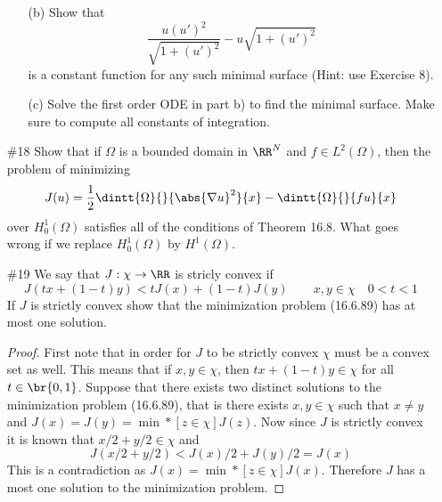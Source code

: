 \documentclass[11pt, oneside]{article}
\begin{document}
\begin{enumerate}
\begin{enumerate}
      \item[(b)]
        Show that
        \[
          \frac{u(u')^2}{\sqrt{1 + (u')^2}} - u\sqrt{1 + (u')^2}
        \]
        is a constant function for any such minimal surface (Hint: use Exercise 8).

      \item[(c)]
        Solve the first order ODE in part b) to find the minimal surface.
        Make sure to compute all constants of integration.
    \end{enumerate}

  \pagebreak
  \item[\#18]
    Show that if $\Omega$ is a bounded domain in $\RR^N$ and $f \in L^2(\Omega)$,
    then the problem of minimizing
    \[
      J(u) = \frac{1}{2} \dintt{\Omega}{}{\abs{\nabla u}^2}{x} - \dintt{\Omega}{}{f u}{x}
    \]
    over $H^1_0(\Omega)$ satisfies all of the conditions of Theorem 16.8.
    What goes wrong if we replace $H^1_0(\Omega)$ by $H^1(\Omega)$.

  \pagebreak
  \item[\#19] %
    We say that $J: \chi \to \RR$ is stricly convex if
    \[
      J(tx + (1 - t)y) < tJ(x) + (1 - t)J(y) \qquad x, y \in \chi \quad 0 < t < 1
    \]
    If $J$ is strictly convex show that the minimization problem (16.6.89) has
    at most one solution.

    \begin{proof}
      First note that in order for $J$ to be strictly convex $\chi$ must be a
      convex set as well.
      This means that if $x, y \in \chi$, then $tx + (1 - t)y \in \chi$ for all
      $t \in \br{0, 1}$.
      Suppose that there exists two distinct solutions to the minimization
      problem (16.6.89), that is there exists $x, y \in \chi$ such that
      $x \neq y$ and $J(x) = J(y) = \min*[z \in \chi]{J(z)}$.
      Now since $J$ is strictly convex it is known that $x/2 + y/2 \in \chi$ and
      \[
        J(x/2 + y/2) < J(x)/2 + J(y)/2 = J(x)
      \]
      This is a contradiction as $J(x) = \min*[z \in \chi]{J(x)}$.
      Therefore $J$ has a most one solution to the minimization problem.
    \end{proof}
\end{enumerate}
\end{document}

